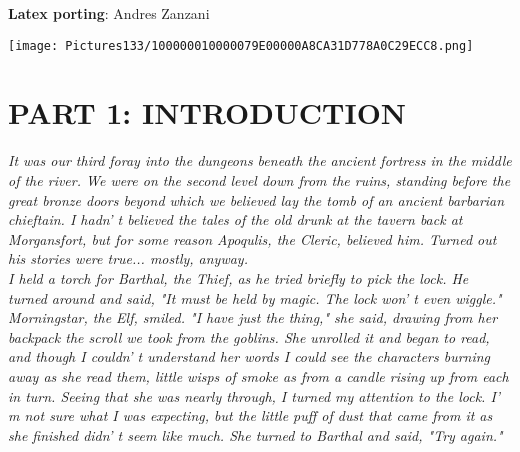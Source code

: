 \documentclass[a4paper,twoside,openany,10pt]{book}
\begin{document}
\textbf{Latex porting}: Andres Zanzani

\pagebreak

\thispagestyle{empty}

\onecolumn

\setcounter{page}{1}

\begin{multicols}{2}

\tableofcontents

\end{multicols}


\pagebreak

\thispagestyle{empty}

\texttt{[image: Pictures133/100000010000079E00000A8CA31D778A0C29ECC8.png]}

\pagebreak



\section{PART 1: INTRODUCTION}\label{part-1-introduction}

\textit{It was our third foray into the dungeons beneath the ancient fortress in the middle of the river. We were on the second level down from the ruins, standing before the great bronze doors beyond which we believed lay the tomb of an ancient barbarian chieftain. I hadn' t believed the tales of the old drunk at the tavern back at Morgansfort, but for some reason Apoqulis, the Cleric, believed him. Turned out his stories were true... mostly, anyway.}\\

\textit{I held a torch for Barthal, the Thief, as he tried briefly to pick the lock. He turned around and said, "It must be held by magic. The lock won' t even wiggle."}\\

\textit{Morningstar, the Elf, smiled. "I have just the thing," she said, drawing from her backpack the scroll we took from the goblins. She unrolled it and began to read, and though I couldn' t understand her words I could see the characters burning away as she read them, little wisps of smoke as from a candle rising up from each in turn. Seeing that she was nearly through, I turned my attention to the lock. I' m not sure what I was expecting, but the little puff of dust that came from it as she finished didn' t seem like much. She turned to Barthal and said, "Try again."}\\
\end{document}
